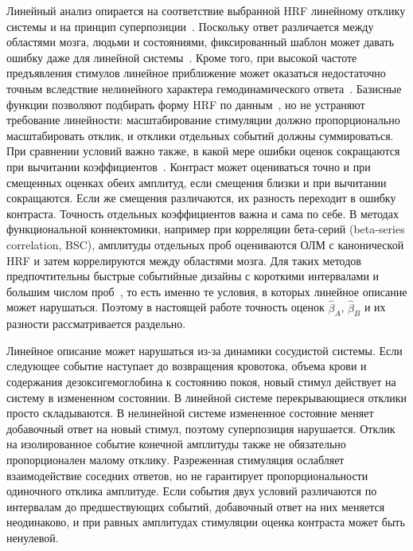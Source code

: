 Линейный анализ опирается на соответствие выбранной HRF линейному отклику системы и на принцип суперпозиции~\cite{monti2011}. Поскольку ответ различается между областями мозга, людьми и состояниями, фиксированный шаблон может давать ошибку даже для линейной системы~\cite{handwerker2012,lindquist2009}. Кроме того, при высокой частоте предъявления стимулов линейное приближение может оказаться недостаточно точным вследствие нелинейного характера гемодинамического ответа~\cite{polimeni2021}. Базисные функции позволяют подбирать форму HRF по данным~\cite{woolrich2004}, но не устраняют требование линейности: масштабирование стимуляции должно пропорционально масштабировать отклик, и отклики отдельных событий должны суммироваться. При сравнении условий важно также, в какой мере ошибки оценок сокращаются при вычитании коэффициентов~\cite{friston1994,wager2003}. Контраст может оцениваться точно и при смещенных оценках обеих амплитуд, если смещения близки и при вычитании сокращаются. Если же смещения различаются, их разность переходит в ошибку контраста. Точность отдельных коэффициентов важна и сама по себе. В методах функциональной коннектомики, например при корреляции бета-серий (\foreignlanguage{english}{beta-series correlation}, BSC), амплитуды отдельных проб оцениваются ОЛМ с канонической HRF и затем коррелируются между областями мозга. Для таких методов предпочтительны быстрые событийные дизайны с короткими интервалами и большим числом проб~\cite{masharipov2024}, то есть именно те условия, в которых линейное описание может нарушаться. Поэтому в настоящей работе точность оценок $\hat\beta_A$, $\hat\beta_B$ и их разности рассматривается раздельно.

Линейное описание может нарушаться из-за динамики сосудистой системы. Если следующее событие наступает до возвращения кровотока, объема крови и содержания дезоксигемоглобина к состоянию покоя, новый стимул действует на систему в измененном состоянии. В линейной системе перекрывающиеся отклики просто складываются. В нелинейной системе измененное состояние меняет добавочный ответ на новый стимул, поэтому суперпозиция нарушается. Отклик на изолированное событие конечной амплитуды также не обязательно пропорционален малому отклику. Разреженная стимуляция ослабляет взаимодействие соседних ответов, но не гарантирует пропорциональности одиночного отклика амплитуде. Если события двух условий различаются по интервалам до предшествующих событий, добавочный ответ на них меняется неодинаково, и при равных амплитудах стимуляции оценка контраста может быть ненулевой.

